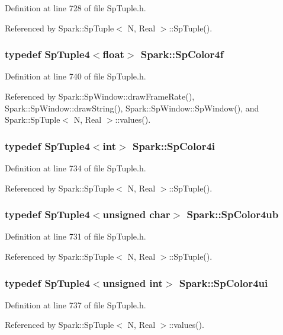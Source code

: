 Definition at line 728 of file Sp\-Tuple.h.

Referenced by Spark::Sp\-Tuple$<$ N, Real $>$::Sp\-Tuple().
\subsubsection{\setlength{\rightskip}{0pt plus 5cm}typedef {\bf Sp\-Tuple4}$<$float$>$ {\bf Spark::Sp\-Color4f}}\label{namespaceSpark_a31}


Definition at line 740 of file Sp\-Tuple.h.

Referenced by Spark::Sp\-Window::draw\-Frame\-Rate(), Spark::Sp\-Window::draw\-String(), Spark::Sp\-Window::Sp\-Window(), and Spark::Sp\-Tuple$<$ N, Real $>$::values().
\subsubsection{\setlength{\rightskip}{0pt plus 5cm}typedef {\bf Sp\-Tuple4}$<$int$>$ {\bf Spark::Sp\-Color4i}}\label{namespaceSpark_a27}


Definition at line 734 of file Sp\-Tuple.h.

Referenced by Spark::Sp\-Tuple$<$ N, Real $>$::Sp\-Tuple().
\subsubsection{\setlength{\rightskip}{0pt plus 5cm}typedef {\bf Sp\-Tuple4}$<$unsigned char$>$ {\bf Spark::Sp\-Color4ub}}\label{namespaceSpark_a25}


Definition at line 731 of file Sp\-Tuple.h.

Referenced by Spark::Sp\-Tuple$<$ N, Real $>$::Sp\-Tuple().
\subsubsection{\setlength{\rightskip}{0pt plus 5cm}typedef {\bf Sp\-Tuple4}$<$unsigned int$>$ {\bf Spark::Sp\-Color4ui}}\label{namespaceSpark_a29}


Definition at line 737 of file Sp\-Tuple.h.

Referenced by Spark::Sp\-Tuple$<$ N, Real $>$::values().
